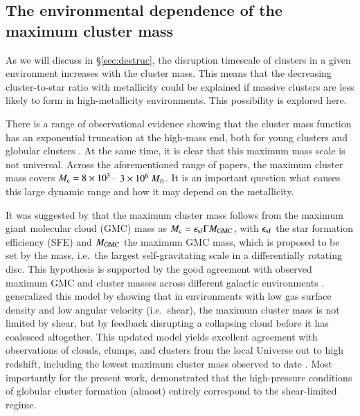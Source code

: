 \documentclass{aa}
\begin{document}
\subsection{The environmental dependence of the maximum cluster mass} \label{sec:form:mmax}

As we will discuss in \S\ref{sec:destruc}, the disruption timescale of clusters in a given environment increases with the cluster mass. This means that the decreasing cluster-to-star ratio with metallicity could be explained if massive clusters are less likely to form in high-metallicity environments. This possibility is explored here.

There is a range of observational evidence showing that the cluster mass function has an exponential truncation at the high-mass end, both for young clusters \citep[e.g.][]{gieles06a,larsen09,portegieszwart10,johnson17} and globular clusters \citep[e.g.][]{fall01,jordan07,kruijssen09b}. At the same time, it is clear that this maximum mass scale is not universal. Across the aforementioned range of papers, the maximum cluster mass covers $M_{\rm c}=8\times10^3$-- $3\times10^6~\mbox{$M_{\odot}$}$. It is an important question what causes this large dynamic range and how it may depend on the metallicity.

It was suggested by \citet{kruijssen14c} that the maximum cluster mass follows from the maximum giant molecular cloud (GMC) mass as $M_{\rm c}=\epsilon_{\rm sf}\Gamma M_{\rm GMC}$, with $\epsilon_{\rm sf}$ the star formation efficiency (SFE) and $M_{\rm GMC}$ the maximum GMC mass, which is proposed to be set by the \citet{toomre64} mass, i.e.~the largest self-gravitating scale in a differentially rotating disc. This hypothesis is supported by the good agreement with observed maximum GMC and cluster masses across different galactic environments \citep{kruijssen14c,adamo15b,freeman17}. \citet{reinacampos17} generalized this model by showing that in environments with low gas surface density and low angular velocity (i.e.~shear), the maximum cluster mass is not limited by shear, but by feedback disrupting a collapsing cloud before it has coalesced altogether. This updated model yields excellent agreement with observations of clouds, clumps, and clusters from the local Universe out to high redshift, including the lowest maximum cluster mass observed to date \citep[$M_{\rm c}=8\times10^3~\msun$ in M31,][]{johnson17}. Most importantly for the present work, \citet{reinacampos17} demonstrated that the high-pressure conditions of globular cluster formation (almost) entirely correspond to the shear-limited regime.
\end{document}
